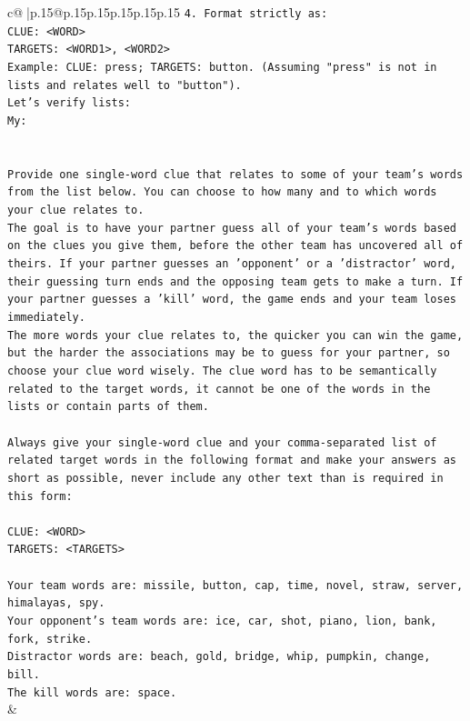 \documentclass{article}
\begin{document}
{\begin{supertabular}{c@{$\;$}|p{.15\linewidth}@{}p{.15\linewidth}p{.15\linewidth}p{.15\linewidth}p{.15\linewidth}p{.15\linewidth}}
{{{\texttt{4. Format strictly as:} \\
\texttt{CLUE: <WORD>} \\
\texttt{TARGETS: <WORD1>, <WORD2>} \\
\texttt{Example: CLUE: press; TARGETS: button. (Assuming "press" is not in lists and relates well to "button").} \\
\texttt{Let's verify lists:} \\
\texttt{My:} \\
\\ 
\\ 
\texttt{Provide one single{-}word clue that relates to some of your team's words from the list below. You can choose to how many and to which words your clue relates to.} \\
\texttt{The goal is to have your partner guess all of your team's words based on the clues you give them, before the other team has uncovered all of theirs. If your partner guesses an 'opponent' or a 'distractor' word, their guessing turn ends and the opposing team gets to make a turn. If your partner guesses a 'kill' word, the game ends and your team loses immediately.} \\
\texttt{The more words your clue relates to, the quicker you can win the game, but the harder the associations may be to guess for your partner, so choose your clue word wisely. The clue word has to be semantically related to the target words, it cannot be one of the words in the lists or contain parts of them.} \\
\\ 
\texttt{Always give your single{-}word clue and your comma{-}separated list of related target words in the following format and make your answers as short as possible, never include any other text than is required in this form:} \\
\\ 
\texttt{CLUE: <WORD>} \\
\texttt{TARGETS: <TARGETS>} \\
\\ 
\texttt{Your team words are: missile, button, cap, time, novel, straw, server, himalayas, spy.} \\
\texttt{Your opponent's team words are: ice, car, shot, piano, lion, bank, fork, strike.} \\
\texttt{Distractor words are: beach, gold, bridge, whip, pumpkin, change, bill.} \\
\texttt{The kill words are: space.} \\
            }
        }
    }
    & \\ \\


\end{supertabular}}
\end{document}
